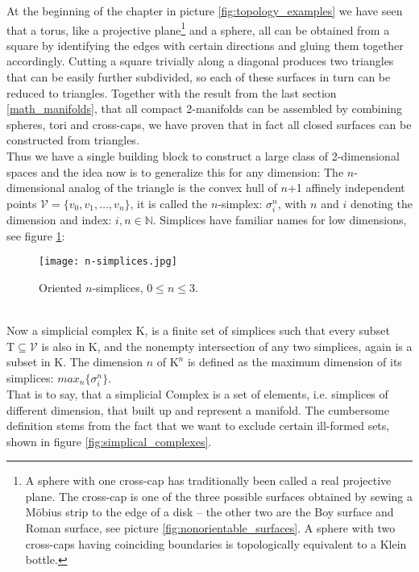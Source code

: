 At the beginning of the chapter in picture \ref{fig:topology_examples} we have seen that a torus, like a projective plane\footnote{ A sphere with one cross-cap has traditionally been called a real projective plane. The cross-cap is one of the three possible surfaces obtained by sewing a Möbius strip to the edge of a disk -- the other two are the Boy surface and Roman surface, see picture \ref{fig:nonorientable_surfaces}. A sphere with two cross-caps having coinciding boundaries is topologically equivalent to a Klein bottle.} and a sphere, all can be obtained from a
square by identifying the edges with certain directions and gluing them together accordingly.
Cutting a square trivially along a diagonal produces two triangles that can be easily further subdivided, so each of these surfaces in turn can be reduced to triangles.
Together with the result from the last section \ref{math_manifolds}, that all compact 2-manifolds can be assembled by combining spheres, tori and cross-caps, we have proven that in fact all closed surfaces can be constructed from triangles.\\
Thus we have a single building block to construct a large class of 2-dimensional spaces and the idea now is to generalize this for any dimension:
The $n$-dimensional analog of the triangle is the convex hull of $n$+1 affinely independent points $\mathcal{V} = \{v_{0}, v_{1}, \dots , v_{n}\}$, it is called the $n$-simplex: $\sigma^{n}_{i}$, with $n$ and $i$ denoting the dimension and index: $i,n \in \mathbb{N}$.
Simplices have familiar names for low dimensions, see figure \ref{fig:n-simplices}:
\begin{figure}[ht]
\centering
\texttt{[image: n-simplices.jpg]}
\caption{Oriented $n$-simplices, $0 \leq n \leq 3$.}
\label{fig:n-simplices}
\end{figure}\\
Now a simplicial complex $\mathrm{K}$, is a finite set of simplices such that every subset $\mathrm{T} \subseteq \mathcal{V}$ is also in $\mathrm{K}$, and the nonempty intersection of any two simplices, again is a subset in $\mathrm{K}$.
The dimension $n$ of $\mathrm{K}^{n}$ is defined as the maximum dimension of its simplices: $max_{n}\{\sigma^{n}_{i}\}$.\\
That is to say, that a simplicial Complex is a set of elements, i.e. simplices of different dimension, that built up and represent a manifold.
The cumbersome definition stems from the fact that we want to exclude certain ill-formed sets, shown in figure \ref{fig:simplical_complexes}.\\
